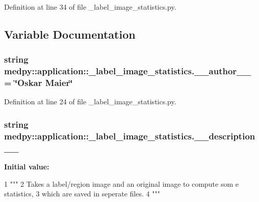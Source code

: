 Definition at line 34 of file \_\-label\_\-image\_\-statistics.py.



\subsection{Variable Documentation}
\hypertarget{namespacemedpy_1_1application_1_1__label__image__statistics_ac1fb29054aca3abac7efd9e5c775a262}{
\subsubsection[{\_\-\_\-author\_\-\_\-}]{\setlength{\rightskip}{0pt plus 5cm}string {\bf medpy::application::\_\-label\_\-image\_\-statistics.\_\-\_\-author\_\-\_\-} = \char`\"{}Oskar Maier\char`\"{}}}
\label{namespacemedpy_1_1application_1_1__label__image__statistics_ac1fb29054aca3abac7efd9e5c775a262}


Definition at line 24 of file \_\-label\_\-image\_\-statistics.py.

\hypertarget{namespacemedpy_1_1application_1_1__label__image__statistics_ab9b9ebf539e9dfe78ece32d0697325d5}{
\subsubsection[{\_\-\_\-description\_\-\_\-}]{\setlength{\rightskip}{0pt plus 5cm}string {\bf medpy::application::\_\-label\_\-image\_\-statistics.\_\-\_\-description\_\-\_\-}}}
\label{namespacemedpy_1_1application_1_1__label__image__statistics_ab9b9ebf539e9dfe78ece32d0697325d5}
{\bfseries Initial value:}
\begin{DoxyCode}
1 """
2                   Takes a label/region image and an original image to compute som
      e statistics,
3                   which are saved in seperate files.
4                   """
\end{DoxyCode}


